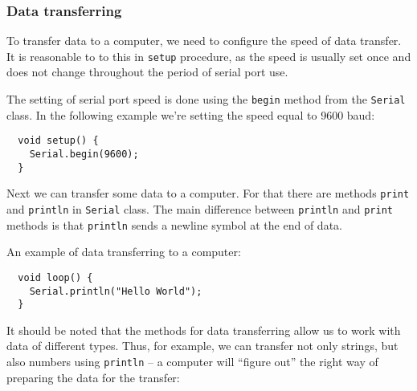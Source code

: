 \documentclass[../sparc.tex]{subfiles}
\begin{document}


\subsubsection{Data transferring}

To transfer data to a computer, we need to configure the speed of data transfer.
It is reasonable to to this in \texttt{setup} procedure, as the speed is usually
set once and does not change throughout the period of serial port use.

The setting of serial port speed is done using the \texttt{begin} method from
the \texttt{Serial} class.  In the following example we're setting the speed
equal to 9600 baud:

\begin{verbatim}
  void setup() {
    Serial.begin(9600);
  }
\end{verbatim}

Next we can transfer some data to a computer.  For that there are methods
\texttt{print} and \texttt{println} in \texttt{Serial} class.  The main
difference between \texttt{println} and \texttt{print} methods is that
\texttt{println} sends a newline symbol at the end of data.


An example of data transferring to a computer:

\begin{verbatim}
  void loop() {
    Serial.println("Hello World");
  }
\end{verbatim}

It should be noted that the methods for data transferring allow us to work with
data of different types.  Thus, for example, we can transfer not only strings,
but also numbers using \texttt{println} -- a computer will ``figure out'' the
right way of preparing the data for the transfer:
\end{document}
